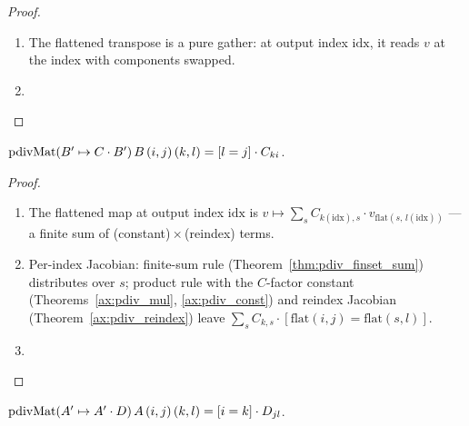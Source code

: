 \begin{proof}
\leanok
\begin{enumerate}
  \item The flattened transpose is a pure gather: at output index
    \(\mathrm{idx}\), it reads \(v\) at the index with components
    swapped.
  \item \Qed{}
\end{enumerate}
\end{proof}

\begin{theorem}
  \label{thm:pdivMat_matmul_left_const}
  \leanok
  \Prove{} \(\operatorname{pdivMat}(B' \mapsto C \cdot B')\, B\, (i,j)\, (k,l)
    = [l = j] \cdot C_{ki}\).
\end{theorem}

\begin{proof}
\leanok
\begin{enumerate}
  \item The flattened map at output index \(\mathrm{idx}\) is
    \(v \mapsto \sum_s C_{k(\mathrm{idx}), s} \cdot
      v_{\mathrm{flat}(s,\, l(\mathrm{idx}))}\) --- a finite sum of
    (constant)\,\(\times\)\,(reindex) terms.
  \item Per-index Jacobian: finite-sum rule
    (Theorem~\ref{thm:pdiv_finset_sum}) distributes over \(s\);
    product rule with the \(C\)-factor constant
    (Theorems~\ref{ax:pdiv_mul}, \ref{ax:pdiv_const}) and reindex
    Jacobian (Theorem~\ref{ax:pdiv_reindex}) leave
    \(\sum_s C_{k, s} \cdot [\mathrm{flat}(i,j) = \mathrm{flat}(s, l)]\).
  \item \Qed{}
\end{enumerate}
\end{proof}

\begin{theorem}
  \label{thm:pdivMat_matmul_right_const}
  \leanok
  \Prove{} \(\operatorname{pdivMat}(A' \mapsto A' \cdot D)\, A\, (i,j)\, (k,l)
    = [i = k] \cdot D_{jl}\).
\end{theorem}

